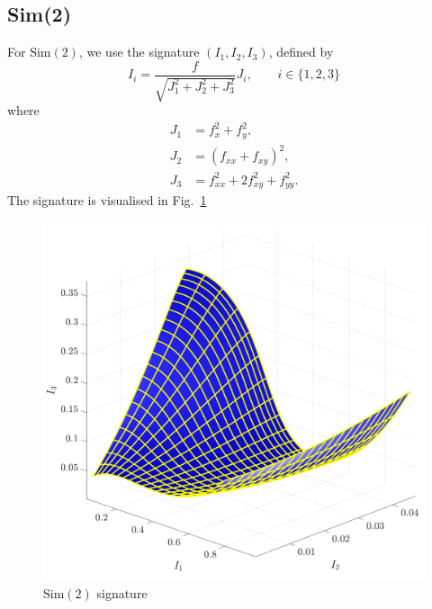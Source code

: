 \documentclass[11pt]{article}
\begin{document}
\subsection{Sim(2)}
For $\text{Sim}(2)$, we use the signature $(I_1, I_2, I_3)$, defined by
\begin{equation}\label{eq:sim2sig}
    I_i = \frac{f}{\sqrt{J_1^2 + J_2^2 + J_3^2}} J_i, \qquad i \in \{1, 2,
    3\}
\end{equation}
where
\begin{equation*}
  \begin{split} 
    J_1 &= f_x^2 + f_y^2, \\
    J_2 &= (f_{xx} + f_{xy})^2, \\
    J_3 &= f_{xx}^2 + 2f_{xy}^2 + f_{yy}^2.
  \end{split}
\end{equation*}
The signature is visualised in Fig.~\ref{fig:sim2signature}
\begin{figure}
  \centering
    \includegraphics[width=12cm]{figures/Sim2_signature}
    \caption{$\text{Sim}(2)$ signature}
    \label{fig:sim2signature}
\end{figure}
\end{document}
